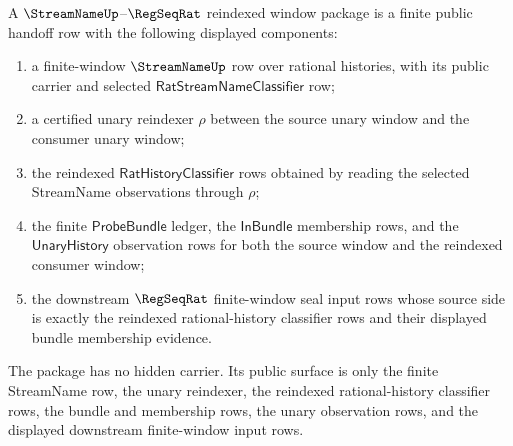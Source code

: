 \begin{definition}
\label{def:streamname-regseqrat-reindexed-window-package}
A $\StreamNameUp$--$\RegSeqRat$ reindexed window package is a finite public
handoff row with the following displayed components:
\begin{enumerate}
  \item a finite-window $\StreamNameUp$ row over rational histories, with its
  public carrier and selected $\mathsf{RatStreamNameClassifier}$ row;
  \item a certified unary reindexer $\rho$ between the source unary window and
  the consumer unary window;
  \item the reindexed $\mathsf{RatHistoryClassifier}$ rows obtained by reading
  the selected StreamName observations through $\rho$;
  \item the finite $\mathsf{ProbeBundle}$ ledger, the
  $\mathsf{InBundle}$ membership rows, and the $\mathsf{UnaryHistory}$
  observation rows for both the source window and the reindexed consumer
  window;
  \item the downstream $\RegSeqRat$ finite-window seal input rows whose source
  side is exactly the reindexed rational-history classifier rows and their
  displayed bundle membership evidence.
\end{enumerate}
The package has no hidden carrier. Its public surface is only the finite
StreamName row, the unary reindexer, the reindexed rational-history classifier
rows, the bundle and membership rows, the unary observation rows, and the
displayed downstream finite-window input rows.
\end{definition}

